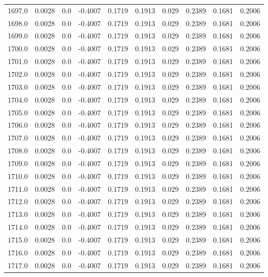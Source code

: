 \begin{longtable}{lrrrrrrrrr}
1697.0 & 0.0028 & 0.0 & -0.4007 & 0.1719 & 0.1913 & 0.029 & 0.2389 & 0.1681 & 0.2006 \\
1698.0 & 0.0028 & 0.0 & -0.4007 & 0.1719 & 0.1913 & 0.029 & 0.2389 & 0.1681 & 0.2006 \\
1699.0 & 0.0028 & 0.0 & -0.4007 & 0.1719 & 0.1913 & 0.029 & 0.2389 & 0.1681 & 0.2006 \\
1700.0 & 0.0028 & 0.0 & -0.4007 & 0.1719 & 0.1913 & 0.029 & 0.2389 & 0.1681 & 0.2006 \\
1701.0 & 0.0028 & 0.0 & -0.4007 & 0.1719 & 0.1913 & 0.029 & 0.2389 & 0.1681 & 0.2006 \\
1702.0 & 0.0028 & 0.0 & -0.4007 & 0.1719 & 0.1913 & 0.029 & 0.2389 & 0.1681 & 0.2006 \\
1703.0 & 0.0028 & 0.0 & -0.4007 & 0.1719 & 0.1913 & 0.029 & 0.2389 & 0.1681 & 0.2006 \\
1704.0 & 0.0028 & 0.0 & -0.4007 & 0.1719 & 0.1913 & 0.029 & 0.2389 & 0.1681 & 0.2006 \\
1705.0 & 0.0028 & 0.0 & -0.4007 & 0.1719 & 0.1913 & 0.029 & 0.2389 & 0.1681 & 0.2006 \\
1706.0 & 0.0028 & 0.0 & -0.4007 & 0.1719 & 0.1913 & 0.029 & 0.2389 & 0.1681 & 0.2006 \\
1707.0 & 0.0028 & 0.0 & -0.4007 & 0.1719 & 0.1913 & 0.029 & 0.2389 & 0.1681 & 0.2006 \\
1708.0 & 0.0028 & 0.0 & -0.4007 & 0.1719 & 0.1913 & 0.029 & 0.2389 & 0.1681 & 0.2006 \\
1709.0 & 0.0028 & 0.0 & -0.4007 & 0.1719 & 0.1913 & 0.029 & 0.2389 & 0.1681 & 0.2006 \\
1710.0 & 0.0028 & 0.0 & -0.4007 & 0.1719 & 0.1913 & 0.029 & 0.2389 & 0.1681 & 0.2006 \\
1711.0 & 0.0028 & 0.0 & -0.4007 & 0.1719 & 0.1913 & 0.029 & 0.2389 & 0.1681 & 0.2006 \\
1712.0 & 0.0028 & 0.0 & -0.4007 & 0.1719 & 0.1913 & 0.029 & 0.2389 & 0.1681 & 0.2006 \\
1713.0 & 0.0028 & 0.0 & -0.4007 & 0.1719 & 0.1913 & 0.029 & 0.2389 & 0.1681 & 0.2006 \\
1714.0 & 0.0028 & 0.0 & -0.4007 & 0.1719 & 0.1913 & 0.029 & 0.2389 & 0.1681 & 0.2006 \\
1715.0 & 0.0028 & 0.0 & -0.4007 & 0.1719 & 0.1913 & 0.029 & 0.2389 & 0.1681 & 0.2006 \\
1716.0 & 0.0028 & 0.0 & -0.4007 & 0.1719 & 0.1913 & 0.029 & 0.2389 & 0.1681 & 0.2006 \\
1717.0 & 0.0028 & 0.0 & -0.4007 & 0.1719 & 0.1913 & 0.029 & 0.2389 & 0.1681 & 0.2006 \\

\end{longtable}
